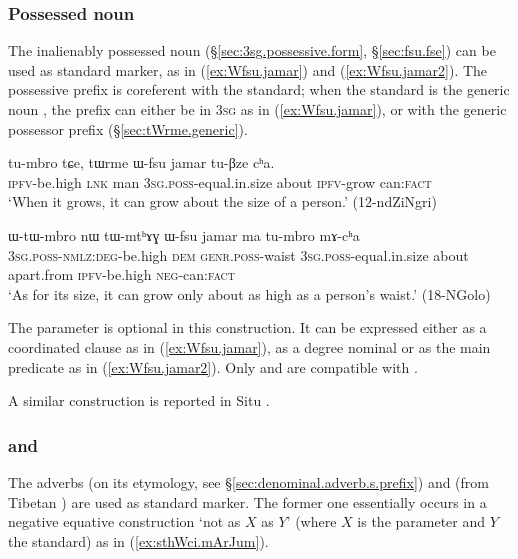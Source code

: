 \subsubsection{Possessed noun} \label{sec:Wfsu.equative}
The inalienably possessed noun   (§\ref{sec:3sg.possessive.form}, §\ref{sec:fsu.fse}) can be used as standard marker, as in (\ref{ex:Wfsu.jamar}) and (\ref{ex:Wfsu.jamar2}). The possessive prefix is coreferent with the standard; when the standard is the generic noun , the prefix can either be in \textsc{3sg} as in (\ref{ex:Wfsu.jamar}), or with the generic possessor prefix (§\ref{sec:tWrme.generic}).

\begin{exe}
\ex \label{ex:Wfsu.jamar}
\gll tu-mbro tɕe, tɯrme ɯ-fsu jamar tu-βze cʰa. \\
\textsc{ipfv}-be.high \textsc{lnk}  man \textsc{3sg}.\textsc{poss}-equal.in.size about \textsc{ipfv}-grow can:\textsc{fact} \\
\glt `When it grows, it can grow about the size of a person.' (12-ndZiNgri)
\end{exe}

\begin{exe}
\ex \label{ex:Wfsu.jamar2}
\gll ɯ-tɯ-mbro nɯ tɯ-mtʰɤɣ ɯ-fsu jamar ma tu-mbro mɤ-cʰa \\
\textsc{3sg}.\textsc{poss}-\textsc{nmlz}:\textsc{deg}-be.high \textsc{dem} \textsc{genr}.\textsc{poss}-waist \textsc{3sg}.\textsc{poss}-equal.in.size about apart.from \textsc{ipfv}-be.high \textsc{neg}-can:\textsc{fact} \\
\glt `As for its size, it can grow only about as high as a person's waist.' (18-NGolo)
\end{exe}

The parameter is optional in this construction. It can be expressed either as a coordinated clause as in (\ref{ex:Wfsu.jamar}), as a degree nominal or as the main predicate as in (\ref{ex:Wfsu.jamar2}). Only  and  are compatible with .

A similar construction is reported in Situ \citep[377]{linxr93jiarong}.

 
\subsubsection{ and } \label{sec:sthWci.equative}
The adverbs  (on its etymology, see §\ref{sec:denominal.adverb.s.prefix}) and   (from Tibetan ) are used as standard marker. The former one  essentially occurs in a negative equative construction `not as $X$ as $Y$' (where $X$ is the parameter and $Y$ the standard) as in (\ref{ex:sthWci.mArJum}).

